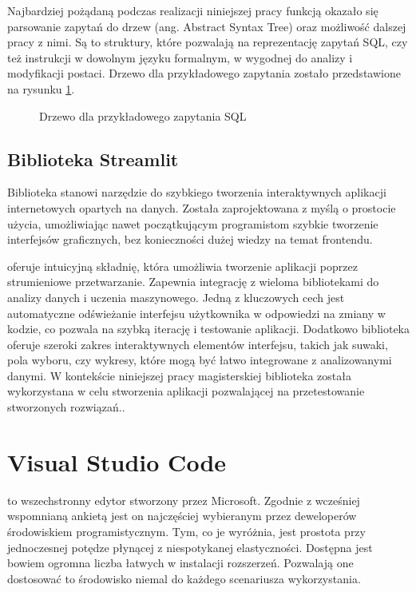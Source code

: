 Najbardziej pożądaną podczas realizacji niniejszej pracy funkcją okazało się parsowanie zapytań do drzew  (ang. Abstract Syntax Tree) oraz możliwość dalszej pracy z nimi. Są to struktury, które pozwalają na reprezentację zapytań SQL, czy też instrukcji w dowolnym języku formalnym, w wygodnej do analizy i modyfikacji postaci. Drzewo  dla przykładowego zapytania zostało przedstawione na rysunku \ref{fig:sql-ast-example}.

\begin{figure}[ht!]
  \centering
  
  \caption{Drzewo  dla przykładowego zapytania SQL}
  \label{fig:sql-ast-example}
\end{figure}

\subsection{Biblioteka Streamlit}
Biblioteka  stanowi narzędzie do szybkiego tworzenia interaktywnych aplikacji internetowych opartych na danych. Została zaprojektowana z myślą o prostocie użycia, umożliwiając nawet początkującym programistom szybkie tworzenie interfejsów graficznych, bez konieczności dużej wiedzy na temat frontendu. 

 oferuje intuicyjną składnię, która umożliwia tworzenie aplikacji poprzez strumieniowe przetwarzanie. Zapewnia integrację z wieloma bibliotekami do analizy danych i uczenia maszynowego. Jedną z kluczowych cech  jest automatyczne odświeżanie interfejsu użytkownika w odpowiedzi na zmiany w kodzie, co pozwala na szybką iterację i testowanie aplikacji. Dodatkowo biblioteka oferuje szeroki zakres interaktywnych elementów interfejsu, takich jak suwaki, pola wyboru, czy wykresy, które mogą być łatwo integrowane z analizowanymi danymi. W kontekście niniejszej pracy magisterskiej biblioteka  została wykorzystana w celu stworzenia aplikacji pozwalającej na przetestowanie stworzonych rozwiązań..

\section{Visual Studio Code}
 to wszechstronny edytor stworzony przez Microsoft. Zgodnie z wcześniej wspomnianą ankietą   jest on najczęściej wybieranym przez deweloperów środowiskiem programistycznym. Tym, co je wyróżnia, jest prostota przy jednoczesnej potędze płynącej z niespotykanej elastyczności. Dostępna jest bowiem ogromna liczba łatwych w instalacji rozszerzeń. Pozwalają one dostosować to środowisko niemal do każdego scenariusza wykorzystania.

